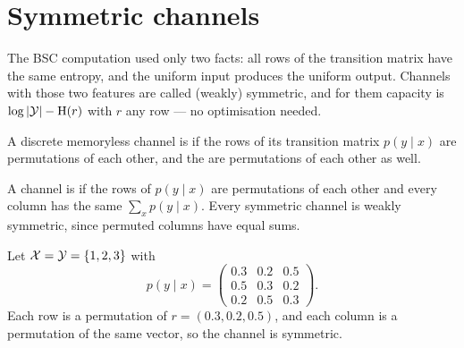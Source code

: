 \section{Symmetric channels}\label{sec:symmetric}
\quad{}

\begin{strand}
The BSC computation used only two facts: all rows of the transition matrix have
the same entropy, and the uniform input produces the uniform output. Channels
with those two features are called (weakly) symmetric, and for them capacity is
$\log|\mathcal{Y}|-\mathrm{H}(r)$ with $r$ any row --- no optimisation needed.
\end{strand}



\begin{definition}\label{def:symmetric-channel}
A discrete memoryless channel is  if the rows of its
transition matrix $p(y\mid x)$ are permutations of each other, and the
 are permutations of each other as well.
\end{definition}

\begin{definition}\label{def:weakly-symmetric-channel}
A channel is  if the rows of $p(y\mid x)$ are
permutations of each other and every column has the same
 $\sum_{x}p(y\mid x)$.
Every symmetric channel is weakly symmetric, since permuted columns have equal
sums.
\end{definition}

\begin{example}\label{ex:symmetric-3x3}
Let $\mathcal{X}=\mathcal{Y}=\{1,2,3\}$ with
\[
  p(y\mid x)=
  \begin{pmatrix}
    0.3 & 0.2 & 0.5\\
    0.5 & 0.3 & 0.2\\
    0.2 & 0.5 & 0.3
  \end{pmatrix}.
\]
Each row is a permutation of $r=(0.3,0.2,0.5)$, and each column is a permutation
of the same vector, so the channel is symmetric.
\end{example}

